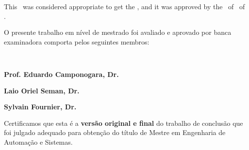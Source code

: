 


\begin{folhadeaprovacao}

    \begin{center}
        {\imprimirautor}

        \begin{center}
            \ABNTEXchapterfont\bfseries\MakeUppercase{\imprimirtitulo}\ifnotempty{\imprimirsubtitulo}{: \imprimirsubtitulo}
        \end{center}

        \begin{minipage}{\textwidth}
            \lang
            {
                This \imprimirtipotrabalho~was considered appropriate to get the \imprimirformacao,
                and it was approved by the \imprimirprograma~of \imprimircentro~of \imprimirinstituicao.
            }
            {
              \begin{center}
                O presente trabalho em nível de mestrado foi avaliado e
                aprovado por banca examinadora comporta pelos seguintes 
                membros: 
              \end{center}
            }
         \end{minipage}%
    \end{center}

    \begin{center}
   
      \textbf{\imprimirorientador}\\
      \imprimirinstituicao
      \vspace{1.5em}

      \textbf{Prof. Eduardo Camponogara, Dr.}\\
      \imprimirinstituicao 
      \vspace{1.5em}

      \textbf{Laio Oriel Seman, Dr.}\\
      \imprimirinstituicao
      \vspace{1.5em}

      \textbf{Sylvain Fournier, Dr.}\\
      \vspace{1.5em}

    \end{center}

    Certificamos que esta é a \textbf{versão original e final} do trabalho de 
    conclusão que foi julgado adequado para obtenção do título de Mestre 
    em Engenharia de Automação e Sistemas.


\end{folhadeaprovacao}
